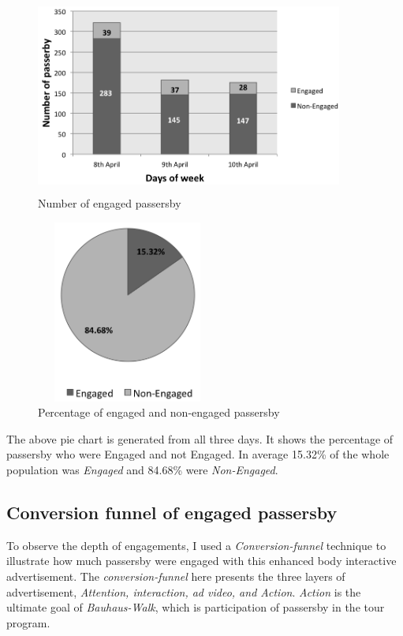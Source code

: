 \begin{figure}[H]
    \centering
    \includegraphics[width=0.9\textwidth,height=6.5cm]{Figures/9/newbody_inter_engage_day}
    \caption{Number of engaged passersby}%
    \label{fig:newbodyengagedandengagedby}%
\end{figure}


\begin{figure}[H]
    \centering
    \includegraphics[width=60mm,height=60mm]{Figures/9/newbody_eng_percentage}
    \caption{Percentage of engaged and non-engaged passersby}%
    \label{fig:newbodyengagedpasserbypercentage}%
\end{figure}

The above pie chart is generated from all three days. It shows the percentage of passersby who were Engaged and not Engaged. In average 15.32\% of the whole population was \emph{Engaged} and 84.68\% were \emph{Non-Engaged}.


\subsection{Conversion funnel of engaged passersby}
To observe the depth of engagements, I used a \emph{Conversion-funnel} \cite{convfunnel} technique to illustrate how much passersby were engaged with this enhanced body interactive advertisement. The \emph{conversion-funnel} here presents the three layers of advertisement, \emph{Attention, interaction, ad video, and Action}. \emph{Action} is the ultimate goal of \emph{Bauhaus-Walk}, which is participation of passersby in the tour program. 

